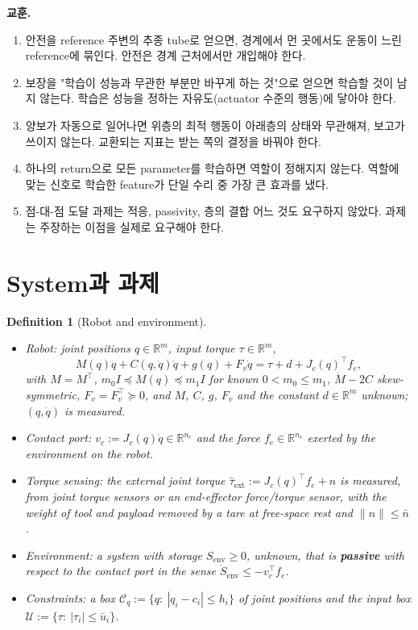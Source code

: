 \documentclass[11pt]{article}\usepackage[margin=1in]{geometry}\usepackage{amsmath,amssymb,amsthm,mathtools}\usepackage{graphicx}\graphicspath{{figures/}{../figures/}{figs/}{./}}\usepackage{enumitem}\usepackage{hyperref}\usepackage{cleveref}\usepackage{tikz}\usetikzlibrary{arrows.meta,positioning,calc,shapes.geometric}\usepackage{float}\usepackage{rotating}\usepackage[most]{tcolorbox}\usepackage{kotex}\usepackage{booktabs}\usepackage{longtable}\emergencystretch=1.6em\tolerance=2000 \crefname{assumption}{Assumption}{Assumptions}\Crefname{assumption}{Assumption}{Assumptions}\crefname{definition}{Definition}{Definitions}\Crefname{definition}{Definition}{Definitions}\crefname{proposition}{Proposition}{Propositions}\Crefname{proposition}{Proposition}{Propositions}\crefname{fact}{Fact}{Facts}\Crefname{fact}{Fact}{Facts} \newtheorem{assumption}{Assumption}\newtheorem{definition}{Definition}\newtheorem{lemma}{Lemma}\newtheorem{proposition}{Proposition}\newtheorem{theorem}{Theorem}\newtheorem{corollary}{Corollary}\newtheorem{fact}{Fact}\theoremstyle{remark}\newtheorem{remark}{Remark} \newcommand{\R}{\mathbb{R}}\newcommand{\xb}{\bar x}\newcommand{\Ab}{\bar A}\newcommand{\By}{\bar B_y}\newcommand{\U}{\mathcal U}\newcommand{\Z}{\mathcal Z}
\begin{document}
\textbf{교훈.}
\begin{enumerate}[label=(\arabic*)]
\item 안전을 reference 주변의 추종 tube로 얻으면, 경계에서 먼 곳에서도 운동이 느린 reference에 묶인다. 안전은 경계 근처에서만 개입해야 한다.
\item 보장을 "학습이 성능과 무관한 부분만 바꾸게 하는 것"으로 얻으면 학습할 것이 남지 않는다. 학습은 성능을 정하는 자유도(actuator 수준의 행동)에 닿아야 한다.
\item 양보가 자동으로 일어나면 위층의 최적 행동이 아래층의 상태와 무관해져, 보고가 쓰이지 않는다. 교환되는 지표는 받는 쪽의 결정을 바꿔야 한다.
\item 하나의 return으로 모든 parameter를 학습하면 역할이 정해지지 않는다. 역할에 맞는 신호로 학습한 feature가 단일 수리 중 가장 큰 효과를 냈다.
\item 점-대-점 도달 과제는 적응, passivity, 층의 결합 어느 것도 요구하지 않았다. 과제는 주장하는 이점을 실제로 요구해야 한다.
\end{enumerate}

\section{System과 과제}
\label{sec:system}

\begin{definition}[Robot and environment]
\label{def:robot}
\begin{itemize}
\item Robot: joint positions $q\in\R^m$, input torque $\tau\in\R^m$,
\[
M(q)\ddot q+C(q,\dot q)\dot q+g(q)+F_v\dot q=\tau+d+J_c(q)^\top f_e,
\]
with $M=M^\top$, $m_0I\preceq M(q)\preceq m_1I$ for known $0<m_0\le m_1$, $\dot M-2C$ skew-symmetric, $F_v=F_v^\top\succeq0$, and $M$, $C$, $g$, $F_v$ and the constant $d\in\R^m$ unknown; $(q,\dot q)$ is measured.
\item Contact port: $v_c:=J_c(q)\dot q\in\R^{n_c}$ and the force $f_e\in\R^{n_c}$ exerted by the environment on the robot.
\item Torque sensing: the external joint torque $\hat\tau_{\mathrm{ext}}:=J_c(q)^\top f_e+n$ is measured, from joint torque sensors or an end-effector force/torque sensor, with the weight of tool and payload removed by a tare at free-space rest and $\|n\|\le\bar n$.
\item Environment: a system with storage $S_{\mathrm{env}}\ge0$, unknown, that is \textbf{\emph{passive}} with respect to the contact port in the sense $\dot S_{\mathrm{env}}\le-v_c^\top f_e$.
\item Constraints: a box $\mathcal C_q:=\{q:\ |q_i-c_i|\le h_i\}$ of joint positions and the input box $\U:=\{\tau:\ |\tau_i|\le\bar u_i\}$.
\end{itemize}
\end{definition}
\end{document}
